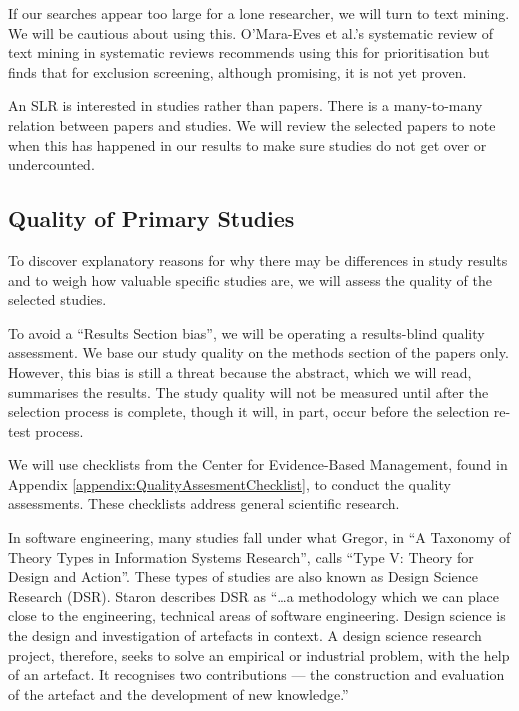 If our searches appear too large for a lone researcher, we will turn to text mining.
We will be cautious about using this.
O'Mara-Eves et al.'s\cite{OMara-Eves_2015} systematic review of text mining in systematic reviews recommends using this for prioritisation but finds that for exclusion screening, although promising, it is not yet proven.

An SLR is interested in studies rather than papers.
There is a many-to-many relation between papers and studies.
We will review the selected papers to note when this has happened in our results to make sure studies do not get over or undercounted.

\subsection{Quality of Primary Studies}
To discover explanatory reasons for why there may be differences in study results and to weigh how valuable specific studies are, we will assess the quality of the selected studies.

To avoid a ``Results Section bias'', we will be operating a results-blind quality assessment.
We base our study quality on the methods section of the papers only.
However, this bias is still a threat because the abstract, which we will read, summarises the results.
The study quality will not be measured until after the selection process is complete, though it will, in part, occur before the selection re-test process.

We will use checklists from the Center for Evidence-Based Management, found in Appendix \ref{appendix:QualityAssesmentChecklist}, to conduct the quality assessments. 
These checklists address general scientific research.

In software engineering, many studies fall under what Gregor\cite{gregor2006nature}, in ``A Taxonomy of Theory Types in Information Systems Research'', calls ``Type V: Theory for Design and Action''.
These types of studies are also known as Design Science Research (DSR).
Staron\cite{Staron_2019} describes DSR as ``\dots a methodology which we can place close to the engineering, technical areas of software engineering. 
Design science is the design and investigation of artefacts in context. 
A design science research project, therefore, seeks to solve an empirical or industrial problem, with the help of an artefact. 
It recognises two contributions — the construction and evaluation of the artefact and the development of new knowledge.''

